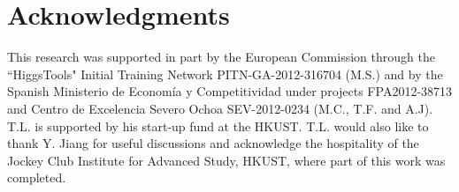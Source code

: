 \documentclass[preprintnumbers,superscriptaddress,nofootinbib,aps,prd,floatfix]{revtex4}
\begin{document}
\section{Acknowledgments}
This research was supported in part by the European Commission through the ``HiggsTools" Initial Training Network PITN-GA-2012-316704 (M.S.) and 
by the Spanish Ministerio de Econom\'ia y Competitividad  under projects FPA2012-38713 and Centro de Excelencia Severo Ochoa SEV-2012-0234 (M.C., T.F. and A.J). T.L. is supported by his start-up fund at the HKUST. T.L.  would also like to thank Y. Jiang for useful discussions and acknowledge the hospitality of the Jockey Club Institute for Advanced Study, HKUST, where part of this work was completed. 


\appendix
\label{app:amplitudes}




\end{document}
